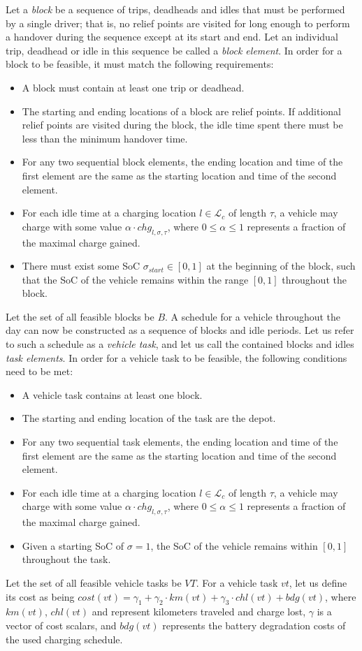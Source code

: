 \documentclass[]{article}
\begin{document}
\noindent Let a \emph{block} be a sequence of trips, deadheads and idles that must be performed by a single driver; that is, no relief points are visited for long enough to perform a handover during the sequence except at its start and end. Let an individual trip, deadhead or idle in this sequence be called a \emph{block element}. In order for a block to be feasible, it must match the following requirements: 
\begin{itemize}
  \item A block must contain at least one trip or deadhead.
  \item The starting and ending locations of a block are relief points. If additional relief points are visited during the block, the idle time spent there must be less than the minimum handover time.
  \item For any two sequential block elements, the ending location and time of the first element are the same as the starting location and time of the second element.
  \item For each idle time at a charging location $l \in \mathcal{L}_c$ of length $\tau$, a vehicle may charge with some value $\alpha \cdot chg_{l,\sigma,\tau}$, where $0 \leq \alpha \leq 1$ represents a fraction of the maximal charge gained. 
  \item There must exist some SoC $\sigma_{start} \in [0, 1]$ at the beginning of the block, such that the SoC of the vehicle remains within the range $[0, 1]$ throughout the block.
\end{itemize}
Let the set of all feasible blocks be $B$. A schedule for a vehicle throughout the day can now be constructed as a sequence of blocks and idle periods. Let us refer to such a schedule as a \textit{vehicle task}, and let us call the contained blocks and idles \emph{task elements}. In order for a vehicle task to be feasible, the following conditions need to be met:
\begin{itemize}
  \item A vehicle task contains at least one block. 
  \item The starting and ending location of the task are the depot. 
  \item For any two sequential task elements, the ending location and time of the first element are the same as the starting location and time of the second element.
  \item For each idle time at a charging location $l \in \mathcal{L}_c$ of length $\tau$, a vehicle may charge with some value $\alpha \cdot chg_{l,\sigma,\tau}$, where $0 \leq \alpha \leq 1$ represents a fraction of the maximal charge gained. 
  \item Given a starting SoC of $\sigma=1$, the SoC of the vehicle remains within $[0, 1]$ throughout the task.
\end{itemize}
Let the set of all feasible vehicle tasks be $VT$. For a vehicle task $vt$, let us define its cost as being $cost(vt) = \gamma_1 + \gamma_2 \cdot km(vt) + \gamma_3 \cdot chl(vt) + bdg(vt)$, where $km(vt)$, $chl(vt)$ and represent kilometers traveled and charge lost, $\gamma$ is a vector of cost scalars, and $bdg(vt)$ represents the battery degradation costs of the used charging schedule.
\end{document}
